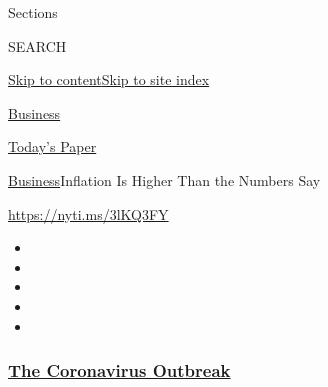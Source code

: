 Sections

SEARCH

\protect\hyperlink{site-content}{Skip to
content}\protect\hyperlink{site-index}{Skip to site index}

\href{https://www.nytimes3xbfgragh.onion/section/business}{Business}

\href{https://myaccount.nytimes3xbfgragh.onion/auth/login?response_type=cookie\&client_id=vi}{}

\href{https://www.nytimes3xbfgragh.onion/section/todayspaper}{Today's
Paper}

\href{/section/business}{Business}\textbar{}Inflation Is Higher Than the
Numbers Say

\url{https://nyti.ms/3lKQ3FY}

\begin{itemize}
\item
\item
\item
\item
\item
\end{itemize}

\hypertarget{the-coronavirus-outbreak}{%
\subsubsection{\texorpdfstring{\href{https://www.nytimes3xbfgragh.onion/news-event/coronavirus?name=styln-coronavirus-markets\&region=TOP_BANNER\&block=storyline_menu_recirc\&action=click\&pgtype=Article\&impression_id=25791370-f1c3-11ea-a0c5-d9bb321ace9a\&variant=undefined}{The
Coronavirus
Outbreak}}{The Coronavirus Outbreak}}\label{the-coronavirus-outbreak}}

